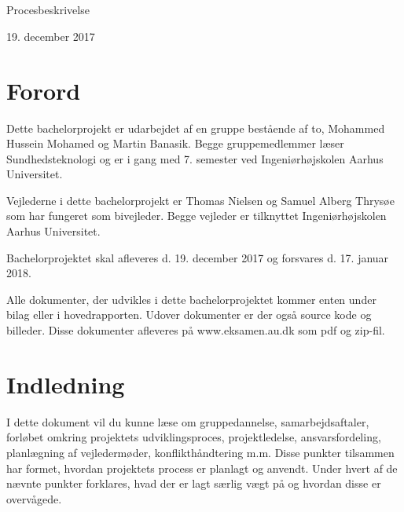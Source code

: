 


\begin{titlingpage}
\begin{center}

~ \\[3cm]




\noindent\makebox[\linewidth]{\rule{\textwidth}{0.4pt}}\\
[0.5cm]{\Huge Procesbeskrivelse}
\noindent\makebox[\linewidth]{\rule{\textwidth}{0.4pt}}
\end{center}
\vfill
\begin{center}
{\large 19. december 2017}
\end{center}
\end{titlingpage}

\newpage
\tableofcontents

\chapter{Forord} 

Dette bachelorprojekt er udarbejdet af en gruppe bestående af to, Mohammed Hussein Mohamed og Martin Banasik. Begge gruppemedlemmer læser Sundhedsteknologi og er i gang med 7. semester ved Ingeniørhøjskolen Aarhus Universitet.

Vejlederne i dette bachelorprojekt er Thomas Nielsen og Samuel Alberg Thrysøe som har fungeret som bivejleder. Begge vejleder er tilknyttet Ingeniørhøjskolen Aarhus Universitet.

Bachelorprojektet skal afleveres d. 19. december 2017 og forsvares d. 17. januar 2018.

Alle dokumenter, der udvikles i dette  bachelorprojektet kommer enten under bilag eller i hovedrapporten. Udover dokumenter er der også source kode og billeder. Disse dokumenter afleveres på  www.eksamen.au.dk som pdf og zip-fil. 



\chapter{Indledning}
I dette dokument vil du kunne læse om gruppedannelse, samarbejdsaftaler, forløbet omkring projektets udviklingsproces, projektledelse, ansvarsfordeling, planlægning af vejledermøder, konflikthåndtering m.m. Disse punkter tilsammen har formet, hvordan projektets process er planlagt og anvendt. Under hvert af de nævnte punkter forklares, hvad der er lagt særlig vægt på og hvordan  disse er overvågede. 



